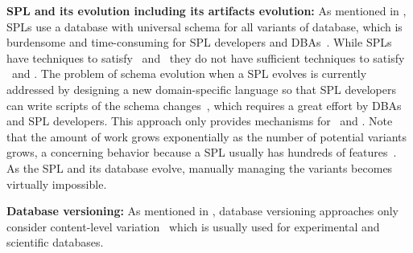 \textbf{SPL and its evolution including its artifacts evolution:}
%
As mentioned in , SPLs use a database with universal schema
for all variants of database, which is burdensome and time-consuming for
SPL developers and DBAs~\cite{vdbSpl18ATW}. While SPLs have techniques
to satisfy \nZero\ and \nThree\ they do not have sufficient techniques to satisfy
\nOne\ and \nTwo.
%
The problem of schema evolution when a SPL evolves is currently addressed by
designing
a new domain-specific language so that SPL developers 
can write scripts of the schema changes~\cite{dbSPLevolve},
which requires a great effort by DBAs and SPL developers.
This approach only provides mechanisms for \nZero\ and \nThree.
Note that the amount of work grows exponentially 
as the number of potential variants grows,
a concerning behavior because
a SPL usually has hundreds of 
features~\cite{cppSpl}. As the SPL and its database evolve,
manually managing the variants becomes virtually impossible. 


\textbf{Database versioning:}
As mentioned in , database versioning approaches only consider
content-level variation~\cite{dbVersioning} which is usually used for experimental and
scientific databases.
